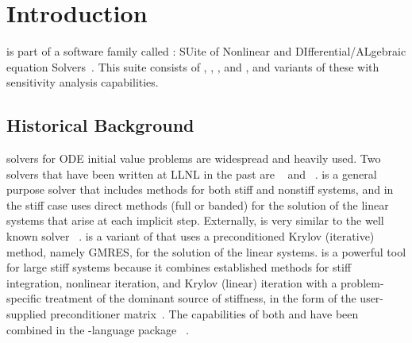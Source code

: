 \chapter{Introduction}\label{s:intro}

{\cvode} is part of a software family called {\sundials}:
SUite of Nonlinear and DIfferential/ALgebraic equation Solvers~\cite{HBGLSSW:05}.
This suite consists of {\cvode}, {\arkode}, {\kinsol}, and {\ida}, and variants
of these with sensitivity analysis capabilities.
%
\section{Historical Background}\label{ss:history}

{\F} solvers for ODE initial value problems are widespread and heavily used.
Two solvers that have been written at LLNL in the past are {\vode}~\cite{BBH:89}
and {\vodpk}~\cite{Byr:92}.
{\vode} is a general purpose solver that includes methods for
both stiff and nonstiff systems, and in the stiff case uses direct methods (full or
banded) for the solution of the linear systems that arise at each implicit
step. Externally, {\vode} is very similar to the well known solver
{\lsode}~\cite{RaHi:94}. {\vodpk}
is a variant of {\vode} that uses a preconditioned Krylov (iterative)
method, namely GMRES, for the solution of the linear systems. {\vodpk}
is a powerful tool for large stiff systems because it combines
established methods for stiff integration, nonlinear iteration, and
Krylov (linear) iteration with a problem-specific treatment of the
dominant source of stiffness, in the form of the user-supplied
preconditioner matrix~\cite{BrHi:89}.  The capabilities of both
{\vode} and {\vodpk} have been combined in the {\CC}-language package
{\cvode}~\cite{CoHi:96}.

